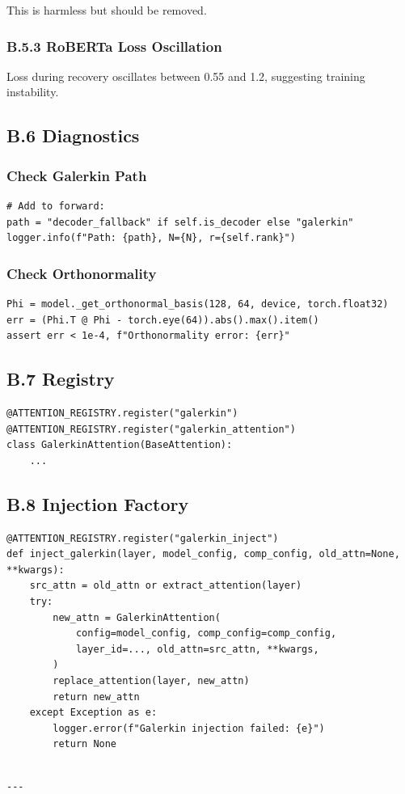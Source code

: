 This is harmless but should be removed.

\subsubsection{B.5.3 RoBERTa Loss Oscillation}

Loss during recovery oscillates between 0.55 and 1.2, suggesting training 
instability.

\subsection{B.6 Diagnostics}

\subsubsection{Check Galerkin Path}

\begin{lstlisting}
# Add to forward:
path = "decoder_fallback" if self.is_decoder else "galerkin"
logger.info(f"Path: {path}, N={N}, r={self.rank}")
\end{lstlisting}

\subsubsection{Check Orthonormality}

\begin{lstlisting}
Phi = model._get_orthonormal_basis(128, 64, device, torch.float32)
err = (Phi.T @ Phi - torch.eye(64)).abs().max().item()
assert err < 1e-4, f"Orthonormality error: {err}"
\end{lstlisting}

\subsection{B.7 Registry}

\begin{lstlisting}
@ATTENTION_REGISTRY.register("galerkin")
@ATTENTION_REGISTRY.register("galerkin_attention")
class GalerkinAttention(BaseAttention):
    ...
\end{lstlisting}

\subsection{B.8 Injection Factory}

\begin{lstlisting}
@ATTENTION_REGISTRY.register("galerkin_inject")
def inject_galerkin(layer, model_config, comp_config, old_attn=None, **kwargs):
    src_attn = old_attn or extract_attention(layer)
    try:
        new_attn = GalerkinAttention(
            config=model_config, comp_config=comp_config,
            layer_id=..., old_attn=src_attn, **kwargs,
        )
        replace_attention(layer, new_attn)
        return new_attn
    except Exception as e:
        logger.error(f"Galerkin injection failed: {e}")
        return None
\end{lstlisting}
\begin{lstlisting}

---
\end{lstlisting}